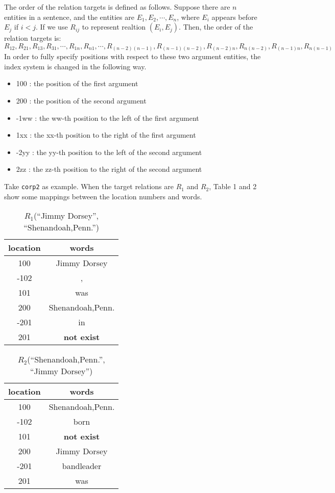 \documentclass[11pt]{article}
\begin{document}
The order of the relation targets is defined as follows.  Suppose there are $n$ entities
in a sentence, and the entities are $E_1, E_2, \cdots, E_n$, where $E_i$ appears before $E_j$
if $i < j$.  If we use $R_{ij}$ to represent realtion $(E_i, E_j)$. 
Then, the order of the relation targets is:
\[ R_{12}, R_{21}, R_{13}, R_{31}, \cdots, R_{1n}, R_{n1}, \cdots, 
   R_{(n-2)(n-1)}, R_{(n-1)(n-2)}, R_{(n-2)n}, R_{n(n-2)},
   R_{(n-1)n}, R_{n(n-1)} \]
In order to fully specify positions with respect to these two argument entities, the 
index system is changed in the following way.
\begin{itemize}
\item 100 : the position of the first argument
\item 200 : the position of the second argument
\item -1ww : the ww-th position to the left of the first argument
\item 1xx : the xx-th position to the right of the first argument
\item -2yy : the yy-th position to the left of the second argument
\item 2zz : the zz-th position to the right of the second argument
\end{itemize}

Take {\tt corp2} as example.  When the target relations are $R_1$ and $R_2$, Table
1 and 2 show some mappings between the location numbers and
words.

 \begin{table}[h] 
   \center
 \begin{tabular}{|c|c|} \hline
   location & words \\ \hline \hline
   100 & Jimmy Dorsey \\ \hline
   -102 & , \\ \hline
   101 & was \\ \hline
   200 & Shenandoah,Penn. \\ \hline
   -201 & in \\ \hline
   201 & {\bf not exist} \\ \hline
 \end{tabular}
 \caption{$R_1$(``Jimmy Dorsey'', ``Shenandoah,Penn.'')}  \label{tab:r1}
 \end{table}

 \begin{table}[h] 
   \center
 \begin{tabular}{|c|c|} \hline
   location & words \\ \hline \hline
   100 & Shenandoah,Penn. \\ \hline
   -102 & born \\ \hline
   101 & {\bf not exist} \\ \hline
   200 & Jimmy Dorsey \\ \hline
   -201 & bandleader \\ \hline
   201 & was \\ \hline
 \end{tabular}
 \caption{$R_2$(``Shenandoah,Penn.'', ``Jimmy Dorsey'')}  \label{tab:r2}
 \end{table}
\end{document}
